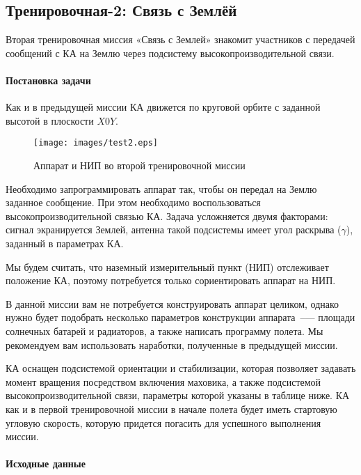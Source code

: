 \documentclass[12pt,a4paper]{article}
\begin{document}
\clearpage
\subsection{Тренировочная-2: Связь с Землёй}

Вторая тренировочная миссия «Связь с Землей» знакомит участников с передачей
сообщений с КА на Землю через подсистему высокопроизводительной связи.

\paragraph{Постановка задачи} 

Как и в предыдущей миссии КА движется по круговой орбите с заданной высотой в плоскости
$X0Y$.

\begin{figure}[tbh]
  \begin{center}
    \texttt{[image: images/test2.eps]}
    \caption{Аппарат и НИП во второй тренировочной миссии}
    \label{Pic:test2}
  \end{center}
\end{figure}

Необходимо запрограммировать аппарат так, чтобы он передал на Землю заданное
сообщение. При этом необходимо воспользоваться   высокопроизводительной связью КА. Задача
усложняется двумя факторами: сигнал экранируется Землей, антенна такой подсистемы имеет
угол раскрыва ($\gamma$), заданный в параметрах КА.

Мы будем считать, что наземный измерительный пункт (НИП) отслеживает положение КА, поэтому
потребуется только сориентировать аппарат на НИП.

В данной миссии вам не потребуется конструировать аппарат целиком, однако нужно будет
подобрать несколько параметров конструкции аппарата~--— площади солнечных батарей и
радиаторов, а также написать программу полета. Мы рекомендуем вам использовать наработки,
полученные в предыдущей миссии.

КА оснащен подсистемой ориентации и стабилизации, которая позволяет задавать момент
вращения посредством включения маховика, а также подсистемой высокопроизводительной связи,
параметры которой указаны в таблице ниже. КА как и в первой тренировочной миссии в начале
полета будет иметь стартовую угловую скорость, которую придется погасить для успешного
выполнения миссии.

\paragraph{Исходные данные}
\end{document}
